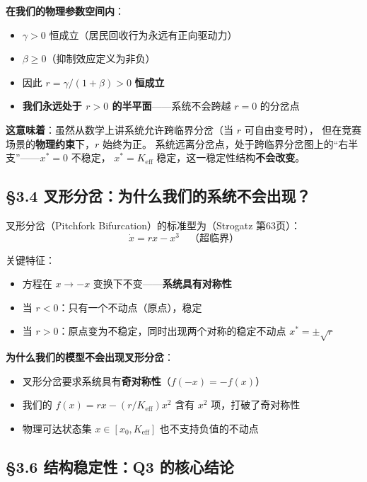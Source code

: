 \documentclass[12pt,a4paper]{article}
\begin{document}
\textbf{在我们的物理参数空间内}：
\begin{itemize}
  \item $\gamma > 0$ 恒成立（居民回收行为永远有正向驱动力）
  \item $\beta \geq 0$（抑制效应定义为非负）
  \item 因此 $r = \gamma/(1+\beta) > 0$ \textbf{恒成立}
  \item \textbf{我们永远处于 $r > 0$ 的半平面}——系统不会跨越 $r = 0$ 的分岔点
\end{itemize}

\textbf{这意味着}：虽然从数学上讲系统允许跨临界分岔（当 $r$ 可自由变号时），
但在竞赛场景的\textbf{物理约束}下，$r$ 始终为正。
系统远离分岔点，处于跨临界分岔图上的``右半支''——$x^* = 0$ 不稳定，
$x^* = K_{\text{eff}}$ 稳定，这一稳定性结构\textbf{不会改变}。

\subsection{\S3.4 叉形分岔：为什么我们的系统不会出现？}

叉形分岔（Pitchfork Bifurcation）的标准型为（Strogatz 第63页）：
\begin{equation}
\dot{x} = r x - x^3 \quad \text{（超临界）}
\end{equation}

关键特征：
\begin{itemize}
  \item 方程在 $x \to -x$ 变换下不变——\textbf{系统具有对称性}
  \item 当 $r < 0$：只有一个不动点（原点），稳定
  \item 当 $r > 0$：原点变为不稳定，同时出现两个对称的稳定不动点 $x^* = \pm\sqrt{r}$
\end{itemize}

\textbf{为什么我们的模型不会出现叉形分岔}：
\begin{itemize}
  \item 叉形分岔要求系统具有\textbf{奇对称性}（$f(-x) = -f(x)$）
  \item 我们的 $f(x) = r x - (r/K_{\text{eff}}) x^2$ 含有 $x^2$ 项，打破了奇对称性
  \item 物理可达状态集 $x \in [x_0, K_{\text{eff}}]$ 也不支持负值的不动点
\end{itemize}

\subsection{\S3.6 结构稳定性：Q3 的核心结论}
\end{document}

